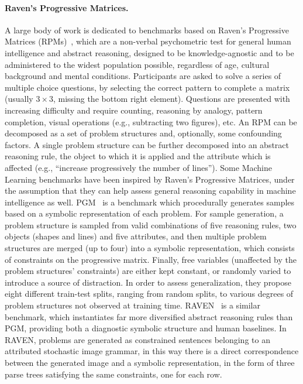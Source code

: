 \paragraph{Raven's Progressive Matrices.}
A large body of work is dedicated to benchmarks based on Raven's Progressive Matrices (RPMs)~\cite{raven1938raven}, which are a non-verbal psychometric test for general human intelligence and abstract reasoning, designed to be knowledge-agnostic and to be administered to the widest population possible, regardless of age, cultural background and mental conditions.
Participants are asked to solve a series of multiple choice questions, by selecting the correct pattern to complete a matrix (usually $3\times3$, missing the bottom right element).
Questions are presented with increasing difficulty and require counting, reasoning by analogy, pattern completion, visual operations (e.g., subtracting two figures), etc.
An RPM can be decomposed as a set of problem structures and, optionally, some confounding factors.
A single problem structure can be further decomposed into an abstract reasoning rule, the object to which it is applied and the attribute which is affected (e.g., ``increase progressively the number of lines'').
%
Some Machine Learning benchmarks have been inspired by Raven's Progressive Matrices, under the assumption that they can help assess general reasoning capability in machine intelligence as well.
PGM~\cite{barrett2018measuring} is a benchmark %
which procedurally generates samples based on a symbolic representation of each problem.
For sample generation, a problem structure is sampled from valid combinations of five reasoning rules, two objects (shapes and lines) and five attributes, and then multiple problem structures are merged (up to four) into a symbolic representation, which consists of constraints on the progressive matrix.
Finally, free variables (unaffected by the problem structures' constraints) are either kept constant, or randomly varied to introduce a source of distraction.
In order to assess generalization, they propose eight different train-test splits, ranging from random splits, to various degrees of problem structures not observed at training time.
%
RAVEN~\cite{zhang2019raven} is a similar benchmark, which instantiates far more diversified abstract reasoning rules than PGM, providing both a diagnostic symbolic structure %
and human baselines.
In RAVEN, problems are generated as constrained sentences belonging to an attributed stochastic image grammar, in this way there is a direct correspondence between the generated image and a symbolic representation, in the form of three parse trees satisfying the same constraints, one for each row. 
